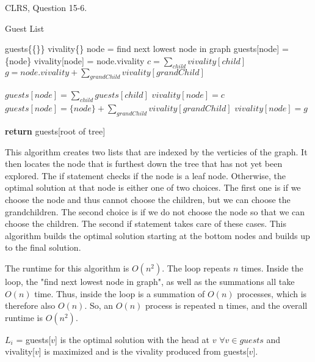 \documentclass{article}
\begin{document}
\nextprob
CLRS, Question 15-6.

\begin{algorithm}
\caption{Guest List}\label{guests}
\begin{algorithmic}[1]
\State guests\{\{\}\}
\State vivality\{\}
\State node = find next lowest node in graph
\State guests[node] = \{node\}
\State vivality[node] = node.vivality
\Else
\State $c = \sum_{child} vivality[child]$
\State $g = node.vivality + \sum_{grandChild} vivality[grandChild]$

\State $guests[node] = \sum_{child} guests[child]$
\State $vivality[node] = c$
\Else
\State $guests[node] = \{node\} + \sum_{grandChild} vivality[grandChild]$
\State $vivality[node] = g$
\EndIf
\EndIf
\EndFor

\State \textbf{return} guests[root of tree]

\EndFunction
\end{algorithmic}
\end{algorithm}

This algorithm creates two lists that are indexed by the verticies of the graph. It then locates the node that is furthest down the tree that has not yet been explored.
The if statement checks if the node is a leaf node. Otherwise, the optimal solution at that node is either one of two choices.
The first one is if we choose the node and thus cannot choose the children, but we can choose the grandchildren.
The second choice is if we do not choose the node so that we can choose the children.
The second if statement takes care of these cases. This algorithm builds the optimal solution starting at the bottom nodes and builds up to the final solution.

The runtime for this algorithm is $O(n^2)$. The loop repeats $n$ times. Inside the loop,
the "find next lowest node in graph", as well as the summations all take $O(n)$ time.
Thus, inside the loop is a summation of $O(n)$ processes, which is therefore also $O(n)$.
So, an $O(n)$ process is repeated n times, and the overall runtime is $O(n^2)$.


$L_i$ = guests[$v$] is the optimal solution with the head at $v$ $\forall v \in guests$ and vivality[$v$] is maximized and is the vivality produced from guests[$v$].
\end{document}
